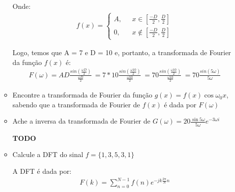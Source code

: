 \documentclass[12pt]{article}
\begin{document}
\begin{itemize}
\begin{itemize}
Onde:
\begin{eqnarray*}
f(x) = \left\{ \begin{array}{rl} 
 A, &\mbox{ $x \in  [\frac{-D}{2}, \frac{D}{2}]$} \\
 0, &\mbox{ $x \notin [\frac{-D}{2}, \frac{D}{2}]$}
       \end{array} \right.
\end{eqnarray*}

Logo, temos que A = 7 e D = 10 e, portanto, a transformada de Fourier da função $f(x)$ é:
\begin{eqnarray*}
    F(\omega) = AD\frac{sin(\frac{\omega D}{2})}{\frac{\omega D}{2}} \
              = 7*10\frac{sin(\frac{\omega 10}{2})}{\frac{\omega 10}{2}} \
              = 70\frac{sin(\frac{\omega 10}{2})}{\frac{\omega 10}{2}} \
              = 70\frac{sin(5\omega)}{5\omega}
\end{eqnarray*}

\item Encontre a transformada de Fourier da função $ g(x) = f(x)\cos
   \omega_0 x$, sabendo que a transformada de Fourier de $f(x)$ é dada
   por $F(\omega)$


\item Ache a inversa da transformada de Fourier de $G(\omega) =
  20\frac{\sin 5\omega}{5\omega}e^{-3\omega i}$
  
\textbf{TODO}
\item Calcule a DFT do sinal $f = \{1,3,5,3,1\}$

A DFT é dada por:
\begin{align*}
    F(k) = \sum\limits_{n=0}^{N-1} f(n) e^{-jk\frac{2\pi}{N}n}
\end{align*}


\end{itemize}
\end{itemize}
\end{document}
